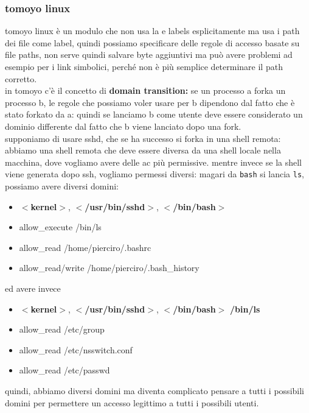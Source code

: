 \documentclass[12pt, oneside]{extbook} %
\begin{document}
\subsubsection{tomoyo linux}
tomoyo linux è un modulo che non usa la e labels esplicitamente ma usa i path dei file come label, quindi possiamo specificare delle regole di accesso basate su file paths, non serve quindi salvare byte aggiuntivi  ma può avere problemi ad esempio per i link simbolici, perché non è più semplice determinare il path corretto.\\in tomoyo c'è il concetto di \textbf{domain transition:} se un processo a forka un processo b, le regole che possiamo voler usare per b dipendono dal fatto che è stato forkato da a: quindi se lanciamo b come utente deve essere considerato un dominio differente dal fatto che b viene lanciato dopo una fork.\\ supponiamo di usare sshd, che se ha successo si forka in una shell remota: abbiamo una shell remota che deve essere diversa da una shell locale nella macchina, dove vogliamo avere delle ac più permissive. mentre invece se la shell viene generata dopo ssh, vogliamo permessi diversi: magari da \texttt{bash} si lancia \texttt{ls}, possiamo avere diversi domini:
\begin{itemize}
\item \textbf{$<$kernel$>$}, \textbf{$<$/usr/bin/sshd$>$}, \textbf{$<$/bin/bash$>$}
\item allow\_execute /bin/ls
\item allow\_read /home/pierciro/.bashrc
\item allow\_read/write /home/pierciro/.bash\_history
\end{itemize}
ed avere invece 
\begin{itemize}
	\item \textbf{$<$kernel$>$}, \textbf{$<$/usr/bin/sshd$>$}, \textbf{$<$/bin/bash$>$} \textbf{/bin/ls}
	\item allow\_read /etc/group
	\item allow\_read /etc/nsswitch.conf
	\item allow\_read /etc/passwd
\end{itemize}
quindi, abbiamo diversi domini ma diventa complicato pensare a tutti i possibili domini per permettere un accesso legittimo a tutti i possibili utenti.
\end{document}
